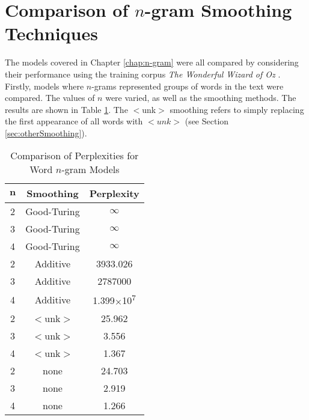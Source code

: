 %



\section{Comparison of $n$-gram Smoothing Techniques}

The models covered in Chapter \ref{chap:n-gram} were all compared by considering their performance using the training corpus \textit{The Wonderful Wizard of Oz} \cite{baum2008wonderful}. Firstly, models where $n$-grams represented groups of words in the text were compared. The values of $n$ were varied, as well as the smoothing methods. The results are shown in Table \ref{table:wordNGram}. The $<$unk$>$ smoothing refers to simply replacing the first appearance of all words with $<unk>$ (see Section \ref{sec:otherSmoothing}).

\begin{table}[h!]
\caption{Comparison of Perplexities for Word $n$-gram Models}
\label{table:wordNGram}
\begin{center}
    \begin{tabular}{|c| c| c|}
    \hline
    $\boldsymbol{n}$ & \textbf{Smoothing} & \textbf{Perplexity} \\ \hline
       2 & Good-Turing & $\infty$ \\ \hline
    3 & Good-Turing & $\infty$ \\ \hline
    4 & Good-Turing& $\infty$ \\ \hline
        2 & Additive & 3933.026 \\ \hline
    3 & Additive & 2787000 \\ \hline
    4 & Additive & 1.399$\times$10\textsuperscript{7} \\ \hline
        2 & $<$unk$>$ & 25.962 \\ \hline
    3 & $<$unk$>$ & 3.556 \\ \hline
    4 & $<$unk$>$ & 1.367 \\ \hline
    2 & none & 24.703 \\ \hline
    3 & none & 2.919 \\ \hline
    4 & none & 1.266 \\ \hline


 
    \end{tabular}
    \end{center}
    \end{table}

